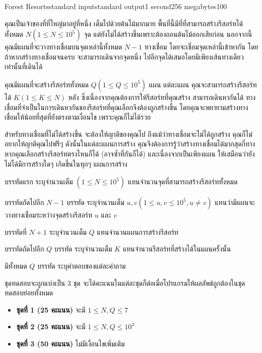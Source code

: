 \documentclass[11pt,a4paper]{article}
\begin{document}
\begin{problem}{Forest Resorts}{standard input}{standard output}{1 second}{256 megabytes}{100}

คุณเป็นเจ้าของที่ที่ใหญ่มาอยู่ที่หนึ่ง เต็มไปด้วยต้นไม้มากมาย พื้นที่นี้มีที่ที่สามารถสร้างรีสอร์ทได้ทั้งหมด $N (1 \leq N \leq 10^5)$ จุด แต่ยังไม่ได้สร้างขึ้นเพราะต้องถอนต้นไม้ออกเสียก่อน นอกจากนี้ คุณมีแผนที่จะวางทางเชื่อมบนจุดเหล่านี้ทั้งหมด $N - 1$ ทางเชื่อม โดยจะเชื่อมจุดเหล่านี้เข้าหากัน โดยถ้าหากสร้างทางเชื่อมจนครบ จะสามารถเดินจากจุดหนึ่ง ไปอีกจุดได้เสมอโดยมีเพียงเส้นทางเดียวเท่านั้นที่เดินได้

คุณมีแผนที่จะสร้างรีสอร์ททั้งหมด $Q (1 \leq Q \leq 10^5)$ แผน แต่ละแผน คุณจะสามารถสร้างรีสอร์ทได้ $K (1 \leq K \leq N)$ หลัง ซึ่งเนื่องจากคุณต้องการให้รีสอร์ทที่คุณสร้าง สามารถเดินหากันได้ ทางเชื่อมที่จำเป็นในการเดินหากันของรีสอร์ทที่คุณเลือกจึงต้องถูกสร้างขึ้น โดยคุณจะพยายามสร้างทางเชื่อมให้น้อยที่สุดที่ยังตรงตามเงื่อนไข เพราะคุณก็ไม่ได้รวย

สำหรับทางเชื่อมที่ไม่ได้สร้างขึ้น จะต้องให้ญาติของคุณไป ถึงแม้ว่าทางเชื่อมจะไม่ได้ถูกสร้าง คุณก็ไม่อยากให้ญาติคุณไปฟรีๆ ดังนั้นในแต่ละแผนการสร้าง คุณจึงต้องการรู้ว่าสร้างทางเชื่อมได้มากสุดกี่ทาง หากคุณเลือกสร้างรีสอร์ทตรงไหนก็ได้ (อาจซ้ำที่กันก็ได้) และเนื่องจากเป็นเพียงแผน ให้เสมือนว่ายังไม่ได้มีการสร้างใดๆ เกิดขึ้นในทุกๆ แผนการสร้าง

\InputFile
บรรทัดแรก ระบุจำนวนเต็ม $(1 \leq N \leq 10^5)$ แทนจำนวนจุดที่สามารถสร้างรีสอร์ททั้งหมด

บรรทัดถัดไปอีก $N - 1$ บรรทัด ระบุจำนวนเต็ม $u, v (1 \leq u, v \leq 10^5, u \neq v)$ แทนว่ามีแผนจะวางทางเชื่อมระหว่างจุดสร้างรีสอร์ท $u$ และ $v$

บรรทัดที่ $N + 1$ ระบุจำนวนเต็ม $Q$ แทนจำนวนแผนการสร้างรีสอร์ท

บรรทัดถัดไปอีก $Q$ บรรทัด ระบุจำนวนเต็ม $K$ แทนจำนวนรีสอร์ทที่สร้างได้ในแผนครั้งนั้น

\OutputFile
มีทั้งหมด $Q$ บรรทัด ระบุคำตอบของแต่ละคำถาม

\Scoring
ชุดทดสอบจะถูกแบ่งเป็น 3 ชุด จะได้คะแนนในแต่ละชุดก็ต่อเมื่อโปรแกรมให้ผลลัพธ์ถูกต้องในชุดทดสอบย่อยทั้งหมด

\begin{itemize}
\item \textbf{ชุดที่ 1 (25 คะแนน)} จะมี $1 \leq N, Q\leq 7$

\item \textbf{ชุดที่ 2 (25 คะแนน)} จะมี $1 \leq N, Q\leq 10^3$

\item \textbf{ชุดที่ 3 (50 คะแนน)} ไม่มีเงื่อนไขเพิ่มเติม
\end{itemize}


\end{problem}
\end{document}
